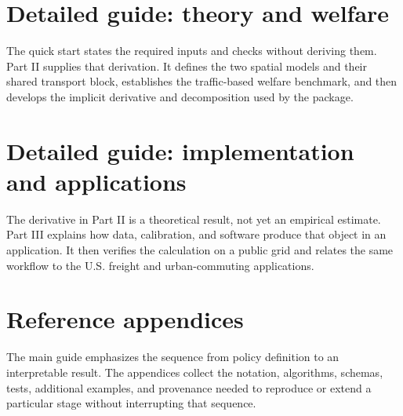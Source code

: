\documentclass[11pt]{article}
\begin{document}
\part{Detailed guide: theory and welfare}
\label{part:detailed}
\label{part:theory}
The quick start states the required inputs and checks without deriving them.
Part II supplies that derivation. It defines the two spatial models and their
shared transport block, establishes the traffic-based welfare benchmark, and
then develops the implicit derivative and decomposition used by the package.







\clearpage
\part{Detailed guide: implementation and applications}
\label{part:implementation}
The derivative in Part II is a theoretical result, not yet an empirical
estimate.
Part III explains how data, calibration, and software produce that object in
an application. It then verifies the calculation on a public grid and relates
the same workflow to the U.S. freight and urban-commuting applications.



\clearpage



\clearpage


\clearpage
{}
\part{Reference appendices}
\label{part:appendices}
\appendix
The main guide emphasizes the sequence from policy definition to an
interpretable result. The appendices collect the notation, algorithms, schemas,
tests, additional examples, and provenance needed to reproduce or extend a
particular stage without interrupting that sequence.




\clearpage



\clearpage
\begingroup
\small


\endgroup
\end{document}
